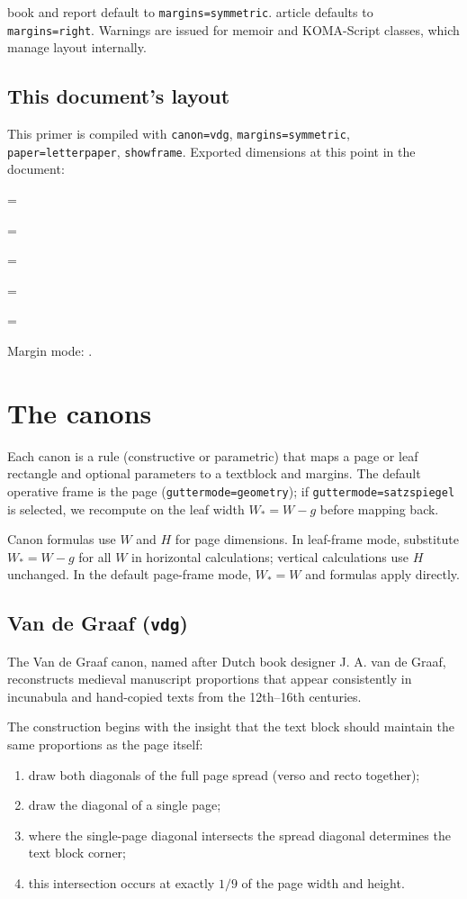 \documentclass[11pt, twoside, openany]{book}
\newcommand{\showlen}[2]{\noindent\texttt{#1} = \the#2\par}
\newcommand{\pkg}[1]{\textsf{#1}}
\begin{document}
\pkg{book} and \pkg{report} default to \texttt{margins=symmetric}. \pkg{article} defaults to \texttt{margins=right}. Warnings are issued for \pkg{memoir} and KOMA-Script classes, which manage layout internally.

\section{This document's layout}\label{sec:thislayout}

This primer is compiled with \texttt{canon=vdg}, \texttt{margins=symmetric}, \texttt{paper=letterpaper}, \texttt{showframe}. Exported dimensions at this point in the document:

\showlen{\string\textwidth}{\textwidth}
\showlen{\string\marginparwidth}{\marginparwidth}
\showlen{\string\marginparsep}{\marginparsep}
\showlen{\string\marginandtext}{\marginandtext}
\showlen{\string\fullwidthoverhang}{\fullwidthoverhang}

Margin mode: \texttt{\pagecanonmargins}.


\chapter{The canons}\label{chapter:canons}

Each canon is a rule (constructive or parametric) that maps a page or leaf rectangle and optional parameters to a textblock and margins. The default operative frame is the page (\texttt{guttermode=geometry}); if \texttt{guttermode=satzspiegel} is selected, we recompute on the leaf width $W_\ast=W-g$ before mapping back.

Canon formulas use $W$ and $H$ for page dimensions. In leaf-frame mode, substitute $W_\ast = W - g$ for all $W$ in horizontal calculations; vertical calculations use $H$ unchanged. In the default page-frame mode, $W_\ast = W$ and formulas apply directly.

\section{Van de Graaf (\texttt{vdg})}\label{sec:vdg}

The Van de Graaf canon, named after Dutch book designer J. A. van de Graaf, reconstructs medieval manuscript proportions that appear consistently in incunabula and hand-copied texts from the 12th--16th centuries.

The construction begins with the insight that the text block should maintain the same proportions as the page itself:
\begin{enumerate}
	\item draw both diagonals of the full page spread (verso and recto together);
	\item draw the diagonal of a single page;
	\item where the single-page diagonal intersects the spread diagonal determines the text block corner;
	\item this intersection occurs at exactly $1/9$ of the page width and height.
\end{enumerate}
\end{document}
